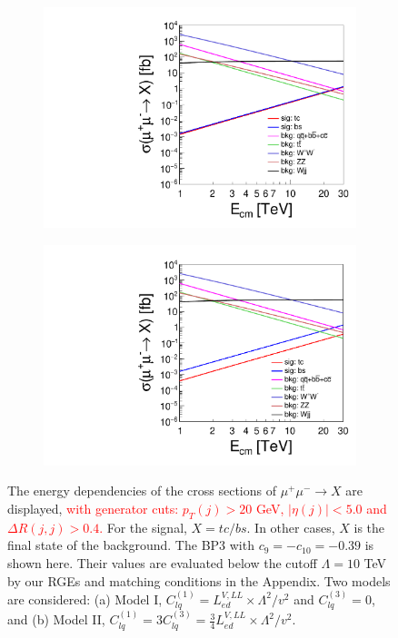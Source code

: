 \documentclass[a4paper,11pt]{article}
\begin{document}
\begin{figure}
  \centering
  \captionsetup[sub]{font=large}
  \begin{subfigure}[t]{0.45\textwidth}
     \includegraphics[width=\linewidth]{e_sigma_clq1_only_log.pdf}
     \caption{}
  \end{subfigure}
  \begin{subfigure}[t]{0.45\textwidth}
     \includegraphics[width=\linewidth]{e_sigma_clq1_eq_3clq3_log.pdf}
     \caption{}
  \end{subfigure}
  \caption{The energy dependencies of the cross sections of $\mu^+\mu^-\to X$ are displayed, \textcolor{red}{with generator cuts: $p_T(j)>20$ GeV, $|\eta(j)|<5.0$ and $\Delta R(j,j)>0.4$.} For the signal, $X=tc/bs$. In other cases, $X$ is the final state of the background. The BP3 with $c_{9}=-c_{10}=-0.39$ is shown here. Their values are evaluated below the cutoff $\Lambda=10$ TeV by our RGEs and matching conditions in the Appendix. Two models are considered: (a) Model I, $C^{(1)}_{lq}=L^{V,LL}_{ed}\times \Lambda^2/v^2$ and $C^{(3)}_{lq}=0$,  and (b) Model II, $C^{(1)}_{lq}=3C^{(3)}_{lq}=\frac{3}{4}L^{V,LL}_{ed}\times \Lambda^2/v^2$.\label{ecm}}
\end{figure}
\end{document}
